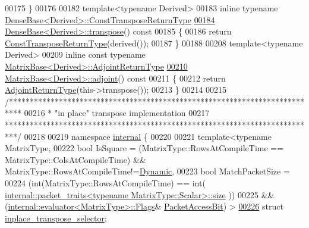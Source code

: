 \begin{DoxyCode}
00175 \}
00176 
00182 \textcolor{keyword}{template}<\textcolor{keyword}{typename} Derived>
00183 \textcolor{keyword}{inline} \textcolor{keyword}{typename} \hyperlink{group___core___module_class_eigen_1_1_transpose}{DenseBase<Derived>::ConstTransposeReturnType}
\hyperlink{group___core___module_a38c0b074cf93fc194bf91141287cee3f}{00184} \hyperlink{group___core___module_ac8952c19644a4ac7e41bea45c19b909c}{DenseBase<Derived>::transpose}()\textcolor{keyword}{ const}
00185 \textcolor{keyword}{}\{
00186   \textcolor{keywordflow}{return} \hyperlink{group___core___module_class_eigen_1_1_transpose}{ConstTransposeReturnType}(derived());
00187 \}
00188 
00208 \textcolor{keyword}{template}<\textcolor{keyword}{typename} Derived>
00209 \textcolor{keyword}{inline} \textcolor{keyword}{const} \textcolor{keyword}{typename} \hyperlink{class_eigen_1_1internal_1_1_tensor_lazy_evaluator_writable}{MatrixBase<Derived>::AdjointReturnType}
\hyperlink{group___core___module_afacca1f88da57e5cd87dd07c8ff926bb}{00210} \hyperlink{group___core___module_afacca1f88da57e5cd87dd07c8ff926bb}{MatrixBase<Derived>::adjoint}()\textcolor{keyword}{ const}
00211 \textcolor{keyword}{}\{
00212   \textcolor{keywordflow}{return} \hyperlink{class_eigen_1_1internal_1_1_tensor_lazy_evaluator_writable}{AdjointReturnType}(this->transpose());
00213 \}
00214 
00215 \textcolor{comment}{/***************************************************************************}
00216 \textcolor{comment}{* "in place" transpose implementation}
00217 \textcolor{comment}{***************************************************************************/}
00218 
00219 \textcolor{keyword}{namespace }\hyperlink{namespaceinternal}{internal} \{
00220 
00221 \textcolor{keyword}{template}<\textcolor{keyword}{typename} MatrixType,
00222   \textcolor{keywordtype}{bool} IsSquare = (MatrixType::RowsAtCompileTime == MatrixType::ColsAtCompileTime) && 
      MatrixType::RowsAtCompileTime!=\hyperlink{namespace_eigen_ad81fa7195215a0ce30017dfac309f0b2}{Dynamic},
00223   \textcolor{keywordtype}{bool} MatchPacketSize =
00224         (\textcolor{keywordtype}{int}(MatrixType::RowsAtCompileTime) == int(
      \hyperlink{struct_eigen_1_1internal_1_1packet__traits}{internal::packet\_traits<typename MatrixType::Scalar>::size}
      ))
00225     &&  (\hyperlink{struct_eigen_1_1internal_1_1evaluator}{internal::evaluator<MatrixType>::Flags}&
      \hyperlink{group__flags_ga1a306a438e1ab074e8be59512e887b9f}{PacketAccessBit}) >
\hyperlink{struct_eigen_1_1internal_1_1inplace__transpose__selector}{00226} \textcolor{keyword}{struct }\hyperlink{struct_eigen_1_1internal_1_1inplace__transpose__selector}{inplace\_transpose\_selector};

\end{DoxyCode}
